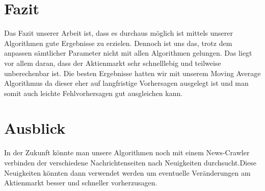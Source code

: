 \documentclass[12pt]{article} %
\begin{document}
\section{Fazit} %

Das Fazit unserer Arbeit ist, dass es durchaus möglich ist mittels unserer Algorithmen
gute Ergebnisse zu erzielen. Dennoch ist uns das, trotz dem anpassen sämtlicher Parameter nicht mit allen Algorithmen gelungen. Das liegt vor allem daran, dass der Aktienmarkt sehr schnelllebig und teilweise unberechenbar ist. Die besten Ergebnisse hatten wir mit unserem Moving Average Algorithmus da dieser eher auf langfristige Vorhersagen ausgelegt ist und man somit auch leichte Fehlvorhersagen gut ausgleichen kann.

\section{Ausblick}

In der Zukunft könnte man unsere Algorithmen noch mit einem News-Crawler verbinden der verschiedene Nachrichtenseiten nach Neuigkeiten durchsucht.Diese Neuigkeiten könnten dann verwendet werden um eventuelle Veränderungen am Aktienmarkt besser und schneller vorherzusagen.



\end{document}
